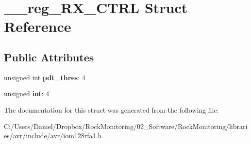 \hypertarget{struct____reg___r_x___c_t_r_l}{}\section{\+\_\+\+\_\+reg\+\_\+\+R\+X\+\_\+\+C\+T\+RL Struct Reference}
\label{struct____reg___r_x___c_t_r_l}
\subsection*{Public Attributes}
\begin{DoxyCompactItemize}
\item 
unsigned int {\bfseries pdt\+\_\+thres}\+: 4\hypertarget{struct____reg___r_x___c_t_r_l_a799890411ea7a0712ff09996671ce39f}{}\label{struct____reg___r_x___c_t_r_l_a799890411ea7a0712ff09996671ce39f}

\item 
unsigned {\bfseries int}\+: 4\hypertarget{struct____reg___r_x___c_t_r_l_a51964aec980c1e8bc426fc07d5f2cd75}{}\label{struct____reg___r_x___c_t_r_l_a51964aec980c1e8bc426fc07d5f2cd75}

\end{DoxyCompactItemize}


The documentation for this struct was generated from the following file\+:\begin{DoxyCompactItemize}
\item 
C\+:/\+Users/\+Daniel/\+Dropbox/\+Rock\+Monitoring/02\+\_\+\+Software/\+Rock\+Monitoring/libraries/avr/include/avr/iom128rfa1.\+h\end{DoxyCompactItemize}
